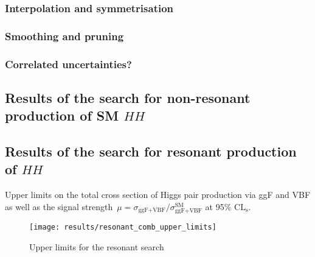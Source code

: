 
\subsubsection{Interpolation and symmetrisation}
\subsubsection{Smoothing and pruning}
\subsubsection{Correlated uncertainties?}

\subsection{Results of the search for non-resonant production of SM $HH$}

\subsection{Results of the search for resonant production of $HH$}


\begin{table}[htbp]
  \centering

  

  \caption{Upper limits on the total cross section of Higgs pair
    production via ggF and VBF as well as the signal
    strength~$\mu = \sigma_\text{ggF+VBF} /
    \sigma_\text{ggF+VBF}^\text{SM}$ at 95\% $\text{CL}_\text{s}$.}
  \label{tab:limits_non_resonant}
\end{table}


\begin{figure}[htbp]
  \centering

  \texttt{[image: results/resonant\_comb\_upper\_limits]}

  \caption{Upper limits for the resonant search}
  \label{fig:res_upper_limits}
\end{figure}

